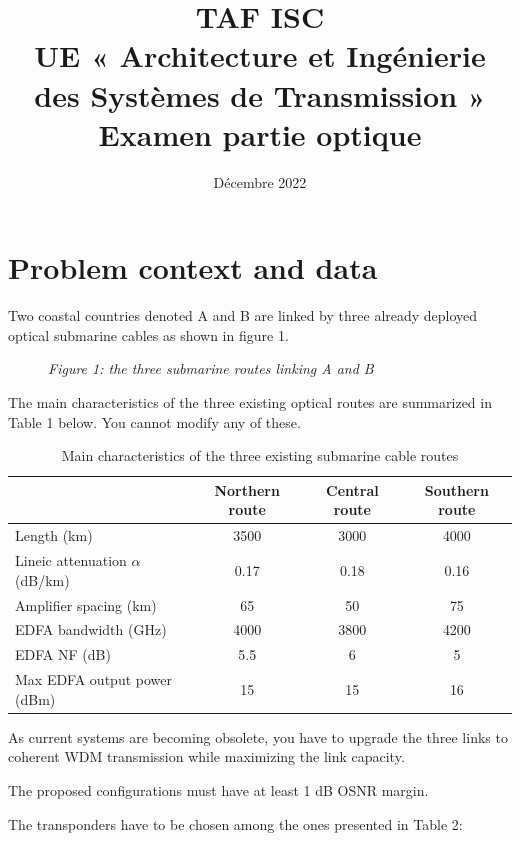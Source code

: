 \documentclass[a4paper,11pt]{article}
\title{\textbf{TAF ISC\\UE « Architecture et Ingénierie des Systèmes de Transmission »\\Examen partie optique}}
\author{Décembre 2022}
\date{}
\begin{document}
\maketitle

\section*{Problem context and data}

Two coastal countries denoted A and B are linked by three already deployed optical submarine cables as shown in figure 1.

\begin{figure}[h]
    \centering
    \textit{Figure 1: the three submarine routes linking A and B}
\end{figure}

The main characteristics of the three existing optical routes are summarized in Table 1 below. You cannot modify any of these.

\begin{table}[h]
\centering
\begin{tabular}{lccc}
\toprule
& \textbf{Northern route} & \textbf{Central route} & \textbf{Southern route} \\
\midrule
Length (km) & 3500 & 3000 & 4000 \\
Lineic attenuation $\alpha$ (dB/km) & 0.17 & 0.18 & 0.16 \\
Amplifier spacing (km) & 65 & 50 & 75 \\
EDFA bandwidth (GHz) & 4000 & 3800 & 4200 \\
EDFA NF (dB) & 5.5 & 6 & 5 \\
Max EDFA output power (dBm) & 15 & 15 & 16 \\
\bottomrule
\end{tabular}
\caption{Main characteristics of the three existing submarine cable routes}
\end{table}

As current systems are becoming obsolete, you have to upgrade the three links to coherent WDM transmission while maximizing the link capacity.

The proposed configurations must have at least 1 dB OSNR margin.

The transponders have to be chosen among the ones presented in Table 2:
\end{document}
